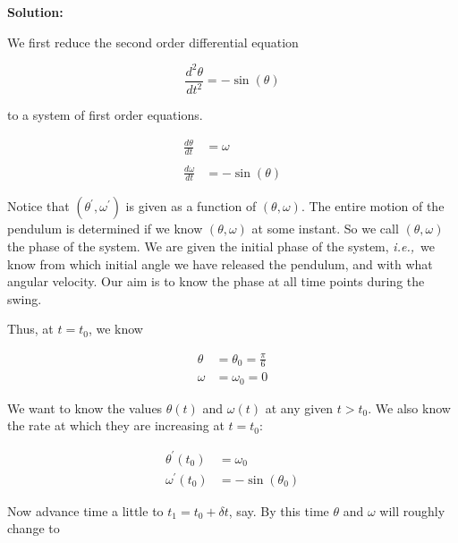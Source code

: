 \documentclass[a4paper,11pt]{report}
\begin{document}
\begin{enumerate}
    \textbf{Solution:}

    We first reduce the second order differential equation

    \begin{equation*}
    \frac{d^{2} \theta}{dt^{2}} = - \sin(\theta)
    \end{equation*}

    to a system of first order equations.

    \begin{equation*}
    \begin{aligned}
    \frac{d \theta}{dt} &= \omega \\ \\
    \frac{d \omega}{dt} &= -\sin(\theta)
    \end{aligned}
    \end{equation*}

    Notice that $(\theta^\prime, \omega^\prime)$ is given as a function of $(\theta,
    \omega)$. The entire motion of the pendulum is determined if we know $(\theta,
    \omega)$ at some instant. So we call $(\theta, \omega)$ the phase of the system. We
    are given the initial phase of the system, \textit{i.e.,}\ we know from which initial
    angle we have released the pendulum, and with what angular velocity. Our aim is to 
    know the phase at all time points during the swing.

    Thus, at $t = t_0$, we know
    
    \begin{equation*}
    \begin{aligned}
    \theta &= \theta_0 = \frac{\pi}{6} \\
    \omega &= \omega_0 = 0
    \end{aligned}
    \end{equation*}

    We want to know the values $\theta(t)$ and $\omega(t)$ at any given $t > t_0$. We 
    also know the rate at which they are increasing at $t = t_0$:

    \begin{equation*}
    \begin{aligned}
    \theta^{\prime}(t_0) &= \omega_0 \\
    \omega^{\prime}(t_0) &= - \sin(\theta_0)
    \end{aligned}
    \end{equation*}

    Now advance time a little to $t_1 = t_0 + \delta t$, say. By this time $\theta$ and
    $\omega$ will roughly change to


\end{enumerate}
\end{document}
